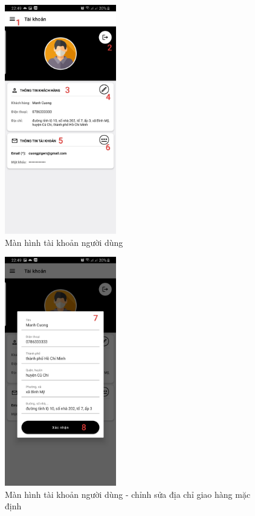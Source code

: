 \documentclass[12pt]{article}
\begin{document}
\begin{figure}[H]
    \centering
    \includegraphics[height=10cm]{images/38.png}
    \caption{Màn hình tài khoản người dùng}
\end{figure}

\begin{figure}[H]
    \centering
    \includegraphics[height=10cm]{images/39.png}
    \caption{Màn hình tài khoản người dùng - chỉnh sửa địa chỉ giao hàng mặc định}
\end{figure}
\end{document}
